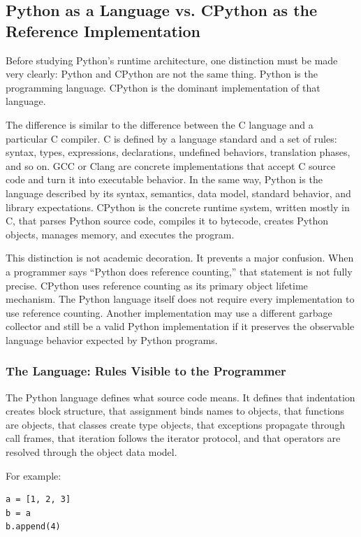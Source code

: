 \subsection{Python as a Language vs. CPython as the Reference Implementation}

Before studying Python's runtime architecture, one distinction must be made very clearly: Python and CPython are not the same thing. Python is the programming language. CPython is the dominant implementation of that language.

The difference is similar to the difference between the C language and a particular C compiler. C is defined by a language standard and a set of rules: syntax, types, expressions, declarations, undefined behaviors, translation phases, and so on. GCC or Clang are concrete implementations that accept C source code and turn it into executable behavior. In the same way, Python is the language described by its syntax, semantics, data model, standard behavior, and library expectations. CPython is the concrete runtime system, written mostly in C, that parses Python source code, compiles it to bytecode, creates Python objects, manages memory, and executes the program.

This distinction is not academic decoration. It prevents a major confusion. When a programmer says “Python does reference counting,” that statement is not fully precise. CPython uses reference counting as its primary object lifetime mechanism. The Python language itself does not require every implementation to use reference counting. Another implementation may use a different garbage collector and still be a valid Python implementation if it preserves the observable language behavior expected by Python programs.

\subsubsection{The Language: Rules Visible to the Programmer}

The Python language defines what source code means. It defines that indentation creates block structure, that assignment binds names to objects, that functions are objects, that classes create type objects, that exceptions propagate through call frames, that iteration follows the iterator protocol, and that operators are resolved through the object data model.

For example:

\begin{verbatim}
a = [1, 2, 3]
b = a
b.append(4)
\end{verbatim}

